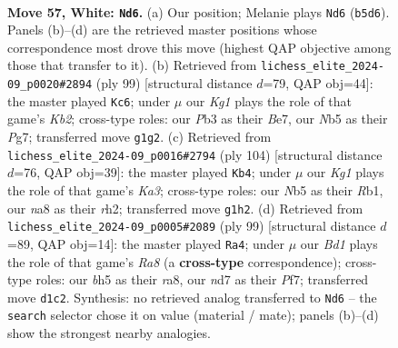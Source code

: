 \documentclass[11pt]{article}
\begin{document}
\clearpage

\begin{figure}[p]\centering
\begin{subfigure}{0.46\textwidth}\centering
\resizebox{\linewidth}{!}{%
\newchessgame
\chessboard[
  setfen={n7/1p1n2k1/1b6/pN1p3b/5B1p/PP2P3/4P3/3B2K1 w - - 10 57},
  showmover=false,
  pgfstyle=straightmove, color=movearrow, markmove={b5-d6}
]}
\caption{}
\end{subfigure}\hfill
\begin{subfigure}{0.46\textwidth}\centering
\resizebox{\linewidth}{!}{%
\newchessgame
\chessboard[
  setfen={8/1k2b1p1/4p3/3pP3/2bP2P1/1p4K1/2n2B2/1R1N4 b - - 7 50},
  showmover=false,
  pgfstyle=straightmove, color=movearrow, markmove={b7-c6}
]}
\caption{}
\end{subfigure}
\\[4pt]
\begin{subfigure}{0.46\textwidth}\centering
\resizebox{\linewidth}{!}{%
\newchessgame
\chessboard[
  setfen={5k2/5p2/2N1p1p1/1B2P3/2P5/KP2b3/4b2r/1R6 w - - 11 53},
  showmover=false,
  pgfstyle=straightmove, color=movearrow, markmove={a3-b4}
]}
\caption{}
\end{subfigure}\hfill
\begin{subfigure}{0.46\textwidth}\centering
\resizebox{\linewidth}{!}{%
\newchessgame
\chessboard[
  setfen={R7/5p1k/6np/pp5N/2bKBPPP/8/8/r7 b - - 12 50},
  showmover=false,
  pgfstyle=straightmove, color=movearrow, markmove={a1-a4}
]}
\caption{}
\end{subfigure}
\caption{\textbf{Move 57, White: \texttt{Nd6}.} (a) Our position; Melanie plays \texttt{Nd6} (\texttt{b5d6}). Panels (b)--(d) are the retrieved master positions whose correspondence most drove this move (highest QAP objective among those that transfer to it). (b) Retrieved from \texttt{lichess\_elite\_2024-09\_p0020\#2894} (ply 99) [structural distance $d$=79, QAP obj=44]: the master played \texttt{Kc6}; under $\mu$ our \emph{Kg1} plays the role of that game's \emph{Kb2}; cross-type roles: our \emph{P}b3 as their \emph{B}e7, our \emph{N}b5 as their \emph{P}g7; transferred move \texttt{g1g2}. (c) Retrieved from \texttt{lichess\_elite\_2024-09\_p0016\#2794} (ply 104) [structural distance $d$=76, QAP obj=39]: the master played \texttt{Kb4}; under $\mu$ our \emph{Kg1} plays the role of that game's \emph{Ka3}; cross-type roles: our \emph{N}b5 as their \emph{R}b1, our \emph{n}a8 as their \emph{r}h2; transferred move \texttt{g1h2}. (d) Retrieved from \texttt{lichess\_elite\_2024-09\_p0005\#2089} (ply 99) [structural distance $d$=89, QAP obj=14]: the master played \texttt{Ra4}; under $\mu$ our \emph{Bd1} plays the role of that game's \emph{Ra8} (a \textbf{cross-type} correspondence); cross-type roles: our \emph{b}h5 as their \emph{r}a8, our \emph{n}d7 as their \emph{P}f7; transferred move \texttt{d1c2}. Synthesis: no retrieved analog transferred to \texttt{Nd6} -- the \texttt{search} selector chose it on value (material / mate); panels (b)--(d) show the strongest nearby analogies.}
\label{fig:thought-m112}
\end{figure}
\end{document}
